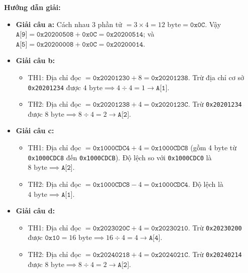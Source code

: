 \textbf{Hướng dẫn giải:}
\begin{itemize}
    \item \textbf{Giải câu a:} Cách nhau 3 phần tử $= 3 \times 4 = 12\text{ byte} = \texttt{0x0C}$. Vậy $\texttt{A[9]} = \texttt{0x20200508} + \texttt{0x0C} = \mathbf{\texttt{0x20200514}}$; và $\texttt{A[5]} = \texttt{0x20200008} + \texttt{0x0C} = \mathbf{\texttt{0x20200014}}$.
    \item \textbf{Giải câu b:}
    \begin{itemize}
        \item TH1: Địa chỉ đọc $= \texttt{0x20201230} + 8 = \texttt{0x20201238}$. Trừ địa chỉ cơ sở \texttt{0x20201234} được $4\text{ byte} \implies 4 \div 4 = 1 \rightarrow \mathbf{\texttt{A[1]}}$.
        \item TH2: Địa chỉ đọc $= \texttt{0x20201238} + 4 = \texttt{0x2020123C}$. Trừ \texttt{0x20201234} được $8\text{ byte} \implies 8 \div 4 = 2 \rightarrow \mathbf{\texttt{A[2]}}$.
    \end{itemize}
    \item \textbf{Giải câu c:}
    \begin{itemize}
        \item TH1: Địa chỉ đọc $= \texttt{0x1000CDC4} + 4 = \texttt{0x1000CDC8}$ (gồm 4 byte từ \texttt{0x1000CDC8} đến \texttt{0x1000CDCB}). Độ lệch so với \texttt{0x1000CDC0} là $8\text{ byte} \implies \mathbf{\texttt{A[2]}}$.
        \item TH2: Địa chỉ đọc $= \texttt{0x1000CDC8} - 4 = \texttt{0x1000CDC4}$. Độ lệch là $4\text{ byte} \implies \mathbf{\texttt{A[1]}}$.
    \end{itemize}
    \item \textbf{Giải câu d:}
    \begin{itemize}
        \item TH1: Địa chỉ đọc $= \texttt{0x2023020C} + 4 = \texttt{0x20230210}$. Trừ \texttt{0x20230200} được $\texttt{0x10} = 16\text{ byte} \implies 16 \div 4 = 4 \rightarrow \mathbf{\texttt{A[4]}}$.
        \item TH2: Địa chỉ đọc $= \texttt{0x20240218} + 4 = \texttt{0x2024021C}$. Trừ \texttt{0x20240214} được $8\text{ byte} \implies 8 \div 4 = 2 \rightarrow \mathbf{\texttt{A[2]}}$.
    \end{itemize}
\end{itemize}


